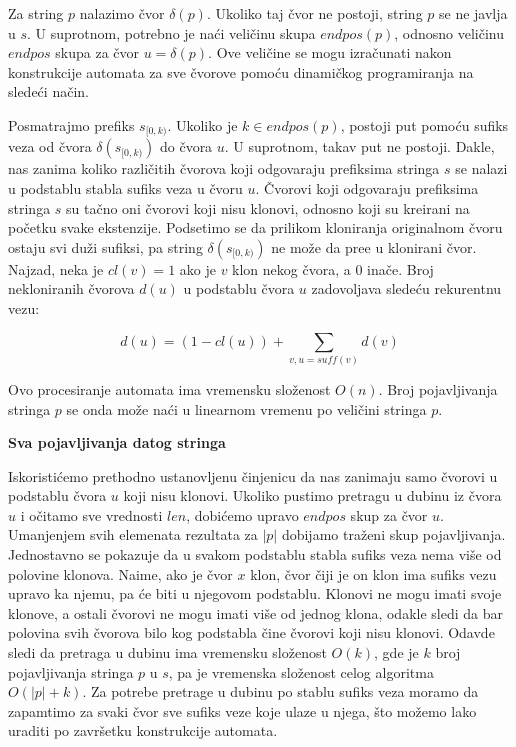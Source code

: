 Za string $p$ nalazimo \v cvor $\delta(p)$. Ukoliko taj \v cvor ne postoji, string $p$ se ne javlja u $s$. U suprotnom, potrebno je na\' ci veli\v cinu skupa $endpos(p)$, odnosno veli\v cinu $endpos$ skupa za \v cvor $u = \delta(p)$. Ove veli\v cine se mogu izra\v cunati nakon konstrukcije automata za sve \v cvorove pomo\' cu dinami\v ckog programiranja na slede\' ci na\v cin.

Posmatrajmo prefiks $s_{[0,k)}$. Ukoliko je $k \in endpos(p)$, postoji put pomo\' cu sufiks veza od \v cvora $\delta(s_{[0,k)})$ do \v cvora $u$. U suprotnom, takav put ne postoji. Dakle, nas zanima koliko razli\v citih \v cvorova koji odgovaraju prefiksima stringa $s$ se nalazi u podstablu stabla sufiks veza u \v cvoru $u$. \v Cvorovi koji odgovaraju prefiksima stringa $s$ su ta\v cno oni \v cvorovi koji nisu klonovi, odnosno koji su kreirani na po\v cetku svake ekstenzije. Podsetimo se da prilikom kloniranja originalnom \v cvoru ostaju svi du\v zi sufiksi, pa string $\delta(s_{[0,k)})$ ne mo\v ze da pre\dj e u klonirani \v cvor. Najzad, neka je $cl(v) = 1$ ako je $v$ klon nekog \v cvora, a $0$ ina\v ce. Broj nekloniranih \v cvorova $d(u)$ u podstablu \v cvora $u$ zadovoljava slede\' cu rekurentnu vezu:

\begin{equation}
    d(u) = (1 - cl(u)) + \sum_{v, u = suff(v)} d(v)
\end{equation}

Ovo procesiranje automata ima vremensku slo\v zenost $O(n)$. Broj pojavljivanja stringa $p$ se onda mo\v ze na\'ci u linearnom vremenu po veli\v cini stringa $p$.

\noindent
\textbf{Sva pojavljivanja datog stringa}

Iskoristi\' cemo prethodno ustanovljenu \v cinjenicu da nas zanimaju samo \v cvorovi u podstablu \v cvora $u$ koji nisu klonovi. Ukoliko pustimo pretragu u dubinu iz \v cvora $u$ i o\v citamo sve vrednosti $len$, dobi\' cemo upravo $endpos$ skup za \v cvor $u$. Umanjenjem svih elemenata rezultata za $|p|$ dobijamo tra\v zeni skup pojavljivanja. Jednostavno se pokazuje da u svakom podstablu stabla sufiks veza nema vi\v se od polovine klonova. Naime, ako je \v cvor $x$ klon, \v cvor \v ciji je on klon ima sufiks vezu upravo ka njemu, pa \' ce biti u njegovom podstablu. Klonovi ne mogu imati svoje klonove, a ostali \v cvorovi ne mogu imati vi\v se od jednog klona, odakle sledi da bar polovina svih \v cvorova bilo kog podstabla \v cine \v cvorovi koji nisu klonovi. Odavde sledi da pretraga u dubinu ima vremensku slo\v zenost $O(k)$, gde je $k$ broj pojavljivanja stringa $p$ u $s$, pa je vremenska slo\v zenost celog algoritma $O(|p|+k)$. Za potrebe pretrage u dubinu po stablu sufiks veza moramo da zapamtimo za svaki \v cvor sve sufiks veze koje ulaze u njega, \v sto mo\v zemo lako uraditi po zavr\v setku konstrukcije automata.
